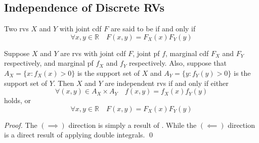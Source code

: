 \documentclass[notoc,notitlepage]{tufte-book}
\begin{document}

\subsection{Independence of Discrete RVs}%
\label{sub:independence_of_discrete_rvs}

\begin{defn}
\label{defn:independence_of_discrete_rvs}
  Two rvs $X$ and $Y$ with joint cdf $F$ are said to be  if and only if
  \begin{equation*}
    \forall x, y \in \mathbb{R} \quad F(x, y) = F_X(x) F_Y(y)
  \end{equation*}
\end{defn}

\begin{thm}[Independence by PF]
\label{thm:independence_by_pf}
  Suppose $X$ and $Y$ are rvs with joint cdf $F$, joint pf $f$, marginal cdf $F_X$ and $F_Y$ respectively, and marginal pf $f_X$ and $f_Y$ respectively. Also, suppose that $A_X = \{x : f_X (x) > 0\}$ is the support set of $X$ and $A_Y = \{y : f_Y(y) > 0\}$ is the support set of $Y$. Then $X$ and $Y$ are independent rvs if and only if either 
  \begin{equation*}
    \forall (x, y) \in A_X \times A_Y \quad f(x, y) = f_X(x) f_Y(y)
  \end{equation*}
  holds, or
  \begin{equation*}
    \forall x, y \in \mathbb{R} \quad F(x, y) = F_X(x) F_Y(y)
  \end{equation*}
\end{thm}

\begin{proof}
  The $(\implies)$ direction is simply a result of . While the $(\impliedby)$ direction is a direct result of applying double integrals. \qed
\end{proof}
\end{document}
